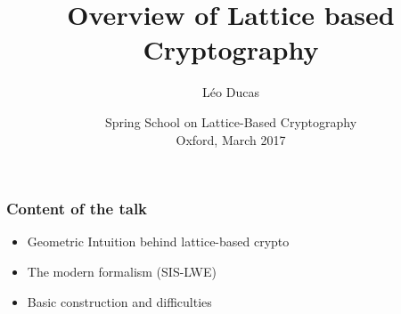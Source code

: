 \documentclass{beamer} %
\title{Overview of Lattice based Cryptography}
\author[Léo Ducas, CWI, Amsterdam, The Netherlands]{\Large Léo Ducas}
\institute{CWI, Amsterdam, The Netherlands \\
\texttt{[image: img/CWI.png]}
}
\date{Spring School on Lattice-Based Cryptography \\
Oxford, March 2017}
\begin{document}
 

\begin{frame}
\titlepage
\end{frame}
\usebackgroundtemplate{}

\begin{frame}
\frametitle{Content of the talk}
\begin{itemize}
  \item Geometric Intuition behind lattice-based crypto
  \item The modern formalism (SIS-LWE)
  \item Basic construction and difficulties
\end{itemize}

  
\end{frame}





\end{document}
